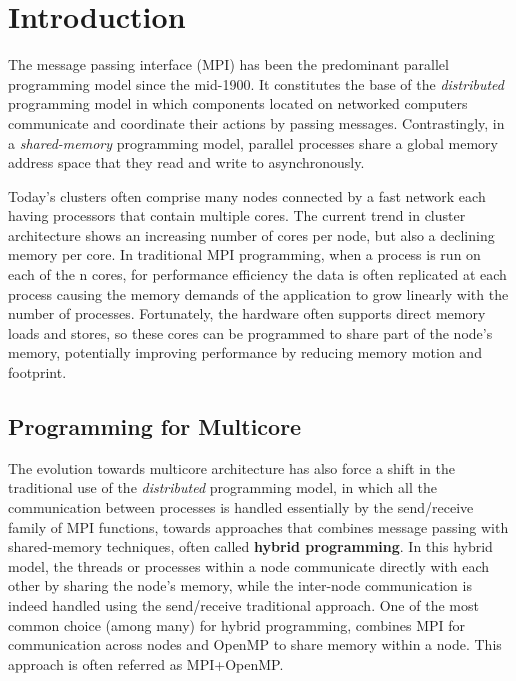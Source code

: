 \section{Introduction}
The message passing interface (MPI) has been the predominant parallel programming model since the mid-1900. It constitutes the base of the \emph{distributed} programming model in which components located on networked computers communicate and coordinate their actions by passing messages. Contrastingly, in a \emph{shared-memory} programming model, parallel processes share a global memory address space that they read and write to asynchronously. 

Today's clusters often comprise many nodes connected by a fast network each having processors that contain multiple cores. The current trend in cluster architecture shows an increasing number of cores per node, but also a declining memory per core. In traditional MPI programming, when a process is run on each of the n cores, for performance efficiency the data is often replicated at each process causing the memory demands of the application to grow linearly with the number of processes. Fortunately, the hardware often supports direct memory loads and stores, so these cores can be programmed to share part of the node's memory, potentially improving performance by reducing memory motion and footprint\cite{UsingAdvancedMPI}. 



\subsection*{Programming for Multicore}

The evolution towards multicore architecture has also force a shift in the traditional use of the \emph{distributed} programming model, in which all the communication between processes is handled essentially by the send/receive family of MPI functions, towards approaches that combines message passing with shared-memory techniques, often called \textbf{hybrid programming}\cite{UsingAdvancedMPI}. In this hybrid model, the threads or processes within a node communicate directly with each other by sharing the node's memory, while the inter-node communication is indeed handled using the send/receive traditional approach. One of the most common choice (among many) for hybrid programming, combines MPI for communication across nodes and OpenMP to share memory within a node. This approach is often referred as MPI+OpenMP.

